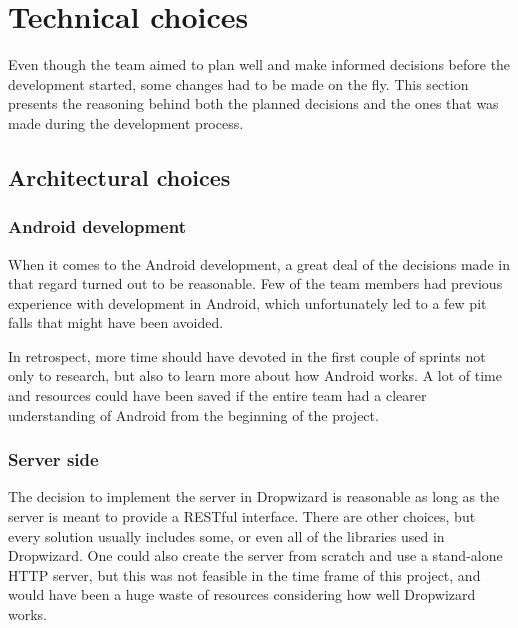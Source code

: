 \section{Technical choices}
Even though the team aimed to plan well and make informed decisions before the development started, some changes had to be made on the fly. This section presents the reasoning behind both the planned decisions and the ones that was made during the development process.

\subsection{Architectural choices}
\subsubsection{Android development}
When it comes to the Android development, a great deal of the decisions made in that regard turned out to be reasonable. Few of the team members had previous experience with development in Android, which unfortunately led to a few pit falls that might have been avoided.

In retrospect, more time should have devoted in the first couple of sprints not only to research, but also to learn more about how Android works. A lot of time and resources could have been saved if the entire team had a clearer understanding of Android from the beginning of the project.

\subsubsection{Server side}

The decision to implement the server in Dropwizard is reasonable as long as the server is meant to provide a RESTful interface. There are other choices, but every solution usually includes some, or even all of the libraries used in Dropwizard. One could also create the server from scratch and use a stand-alone HTTP server, but this was not feasible in the time frame of this project, and would have been a huge waste of resources considering how well Dropwizard works.

